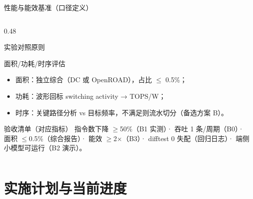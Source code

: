 \documentclass[aspectratio=169]{beamer}
\begin{document}
\begin{frame}{性能与能效基准（口径定义）}
\begin{columns}[T]
\begin{column}{0.48\textwidth}
\begin{block}{实验对照原则}
\begin{itemize}
\end{itemize}
\end{block}
\begin{block}{面积/功耗/时序评估}
\begin{itemize}
  \item 面积：独立综合（DC 或 OpenROAD），占比 $\le$ 0.5\%；
  \item 功耗：波形回标 switching activity → TOPS/W；
  \item 时序：关键路径分析 vs 目标频率，不满足则流水切分（备选方案 B）。
\end{itemize}
\end{block}
\begin{block}{验收清单（对应指标）}
指令数下降 $\ge$50\%（B1 实测）· 吞吐 1 条/周期（B0）· 面积 $\le$0.5\%（综合报告）· 能效 $\ge$2×（B3）· difftest 0 失配（回归日志）· 端侧小模型可运行（B2 演示）。
\end{block}
\end{column}
\end{columns}
\end{frame}

\section{实施计划与当前进度}
\end{document}
